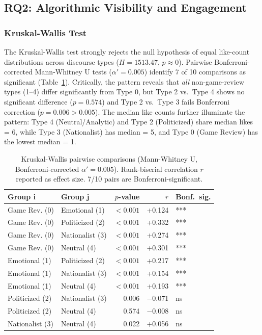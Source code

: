 \documentclass[man, 12pt, mask, floatsintext]{apa7}
\begin{document}
\subsection{RQ2: Algorithmic Visibility and Engagement}
\label{sec:rq2}

\subsubsection{Kruskal-Wallis Test}
The Kruskal-Wallis test strongly rejects the null hypothesis of equal like-count distributions across discourse types ($H = 1513.47$, $p \approx 0$). Pairwise Bonferroni-corrected Mann-Whitney U tests ($\alpha' = 0.005$) identify 7 of 10 comparisons as significant (Table~\ref{tab:kruskal}). Critically, the pattern reveals that \textit{all} non-game-review types (1--4) differ significantly from Type 0, but Type 2 vs.\ Type 4 shows no significant difference ($p = 0.574$) and Type 2 vs.\ Type 3 fails Bonferroni correction ($p = 0.006 > 0.005$). The median like counts further illuminate the pattern: Type 4 (Neutral/Analytic) and Type 2 (Politicized) share median likes = 6, while Type 3 (Nationalist) has median = 5, and Type 0 (Game Review) has the lowest median = 1.

\begin{table}[!htbp]
\centering
\caption{Kruskal-Wallis pairwise comparisons (Mann-Whitney U, Bonferroni-corrected $\alpha' = 0.005$). Rank-biserial correlation $r$ reported as effect size. 7/10 pairs are Bonferroni-significant.}
\label{tab:kruskal}
\begin{tabular}{llrrl}
\toprule
Group i & Group j & $p$-value & $r$ & Bonf.\ sig. \\
\midrule
Game Rev. (0) & Emotional (1) & $< 0.001$ & +0.124 & *** \\
Game Rev. (0) & Politicized (2) & $< 0.001$ & +0.332 & *** \\
Game Rev. (0) & Nationalist (3) & $< 0.001$ & +0.274 & *** \\
Game Rev. (0) & Neutral (4) & $< 0.001$ & +0.301 & *** \\
Emotional (1) & Politicized (2) & $< 0.001$ & +0.217 & *** \\
Emotional (1) & Nationalist (3) & $< 0.001$ & +0.154 & *** \\
Emotional (1) & Neutral (4) & $< 0.001$ & +0.193 & *** \\
Politicized (2) & Nationalist (3) & 0.006 & $-$0.071 & ns \\
Politicized (2) & Neutral (4) & 0.574 & $-$0.008 & ns \\
Nationalist (3) & Neutral (4) & 0.022 & +0.056 & ns \\
\bottomrule
\end{tabular}
\end{table}
\end{document}
